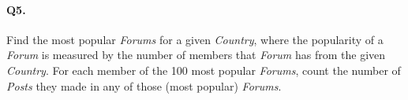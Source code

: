 \paragraph{Q5.}
Find the most popular \emph{Forums} for a given \emph{Country}, where
the popularity of a \emph{Forum} is measured by the number of members
that \emph{Forum} has from the given \emph{Country}.
For each member of the 100 most popular \emph{Forums}, count the number
of \emph{Posts} they made in any of those (most popular) \emph{Forums}.
